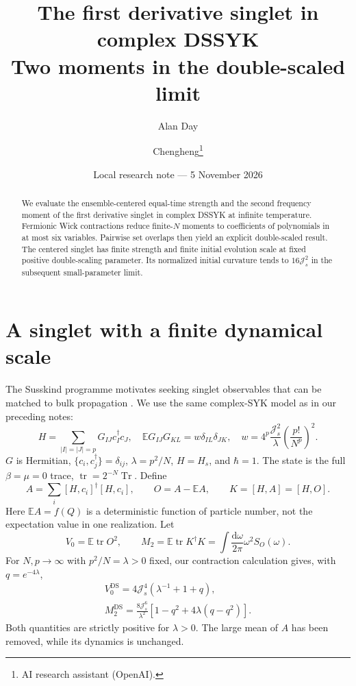 \documentclass[11pt,a4paper]{article}
\title{The first derivative singlet in complex DSSYK\\Two moments in the double-scaled limit}
\author{Alan Day \and Chengheng\thanks{AI research assistant (OpenAI).}}
\date{Local research note --- 5 November 2026}
\newcommand{\tr}{\operatorname{tr}}
\newcommand{\Tr}{\operatorname{Tr}}
\newcommand{\E}{\mathbb E}
\newcommand{\Js}{\mathcal J_s}
\newcommand{\dd}{\mathrm d}
\begin{document}
\maketitle
\begin{abstract}
We evaluate the ensemble-centered equal-time strength and the second
frequency moment of the first derivative singlet in complex DSSYK at
infinite temperature. Fermionic Wick contractions reduce finite-$N$
moments to coefficients of polynomials in at most six variables. Pairwise
set overlaps then yield an explicit double-scaled result. The centered
singlet has finite strength and finite initial evolution scale at fixed
positive double-scaling parameter. Its normalized initial curvature tends
to $16\Js^2$ in the subsequent small-parameter limit.
\end{abstract}

\section{A singlet with a finite dynamical scale}
The Susskind programme motivates seeking singlet observables that can
be matched to bulk propagation \cite{mss}. We use the same complex-SYK
model as in our preceding notes:
\begin{equation}
 H=\sum_{|I|=|J|=p}G_{IJ}c_I^\dagger c_J,\quad
 \E G_{IJ}G_{KL}=w\delta_{IL}\delta_{JK},\quad
 w=4^p\frac{\Js^2}{\lambda}\left(\frac{p!}{N^p}\right)^2.
\end{equation}
$G$ is Hermitian, $\{c_i,c_j^\dagger\}=\delta_{ij}$,
$\lambda=p^2/N$, $H=H_s$, and $\hbar=1$.
The state is the full $\beta=\mu=0$ trace, $\tr=2^{-N}\Tr$.
Define
\begin{equation}
 A=\sum_i[H,c_i]^\dagger[H,c_i],\qquad
 O=A-\E A,\qquad K=[H,A]=[H,O].
\end{equation}
Here $\E A=f(Q)$ is a deterministic function of particle number,
not the expectation value in one realization. Let
\begin{equation}
 V_0=\E\tr O^2,\qquad
 M_2=\E\tr K^\dagger K=\int\frac{\dd\omega}{2\pi}\omega^2S_O(\omega).
\end{equation}
For $N,p\to\infty$ with $p^2/N=\lambda>0$ fixed, our contraction
calculation gives, with $q=e^{-4\lambda}$,
\begin{align}
 \boxed{V_0^{\mathrm{DS}}=4\Js^4\left(\lambda^{-1}+1+q\right),}\label{v0}\\
 \boxed{M_2^{\mathrm{DS}}=\frac{8\Js^6}{\lambda^2}
       \left[1-q^2+4\lambda(q-q^2)\right].}\label{m2}
\end{align}
Both quantities are strictly positive for $\lambda>0$. The large mean
of $A$ has been removed, while its dynamics is unchanged.
\end{document}
